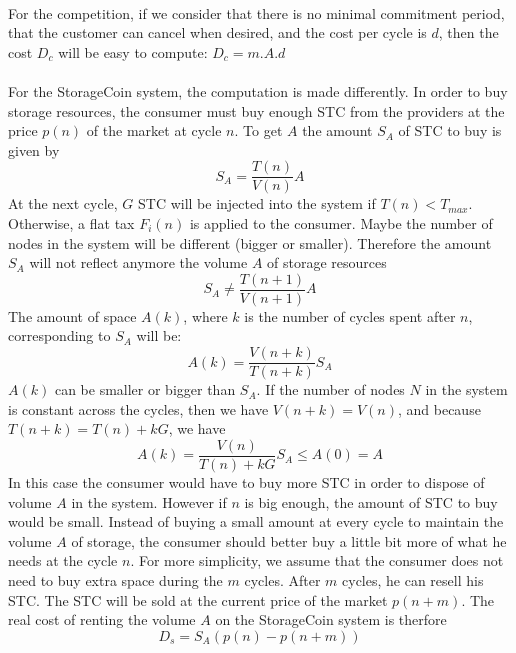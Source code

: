 \documentclass[a4paper,12pt]{article}
\begin{document}
\paragraph*{}
For the competition, if we consider that there is no minimal commitment period, that the customer can cancel when desired, and the cost per cycle is $d$, then the cost $D_{c}$ will be easy to compute: $D_{c}=m.A.d$

\paragraph*{}
For the StorageCoin system, the computation is made differently. In order to buy storage resources, the consumer must buy enough STC from the providers at the price $p(n)$ of the market at cycle $n$.
To get $A$ the amount $S_{A}$ of STC to buy is given by 
\[S_{A}=\frac{T(n)}{V(n)}A\]
At the next cycle, $G$ STC will be injected into the system if $T(n)<T_{max}$. 
Otherwise, a flat tax $F_{i}(n)$ is applied to the consumer.
Maybe the number of nodes in the system will be different (bigger or smaller). 
Therefore the amount $S_{A}$ will not reflect anymore the volume $A$ of storage resources 
\[S_{A}\neq \frac{T(n+1)}{V(n+1)}A\]
The amount of space $A(k)$, where $k$ is the number of cycles spent after $n$, corresponding to $S_{A}$ will be: 
\[A(k)=\frac{V(n+k)}{T(n+k)}S_{A}\]
$A(k)$ can be smaller or bigger than $S_{A}$. If the number of nodes $N$ in the system is constant across the cycles, then we have $V(n+k)=V(n)$, and because $T(n+k)=T(n)+kG$, we have
\[A(k)=\frac{V(n)}{T(n)+kG}S_{A}\le A(0)=A\]
In this case the consumer would have to buy more STC in order to dispose of volume $A$ in the system.
However if $n$ is big enough, the amount of STC to buy would be small.
Instead of buying a small amount at every cycle to maintain the volume $A$ of storage, the consumer should better buy a little bit more of what he needs at the cycle $n$.
For more simplicity, we assume that the consumer does not need to buy extra space during the $m$ cycles.
After $m$ cycles, he can resell his STC. The STC will be sold at the current price of the market $p(n + m)$.
The real cost of renting the volume $A$ on the StorageCoin system is therfore
\[D_{s}=S_{A}(p(n)-p(n+m))\]
\end{document}
